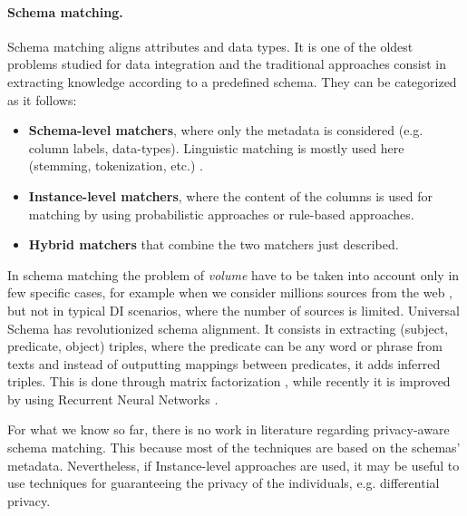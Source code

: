 \documentclass[12pt]{article}
\begin{document}
\paragraph{Schema matching.}
Schema matching aligns attributes and data types. It is one of the oldest problems studied for data integration and the 
traditional approaches consist in extracting knowledge according to a predefined schema. They can be categorized as it follows:
\begin{itemize}
   \item \textbf{Schema-level matchers}, where only the metadata is considered (e.g. column labels, data-types). Linguistic matching is mostly used here (stemming, tokenization, etc.) \cite*{Bernstein2011}.
   \item \textbf{Instance-level matchers}, where the content of the columns is used for matching by using probabilistic approaches \cite*{Szymczak2016, Dasu2002} or rule-based approaches.
   \item \textbf{Hybrid matchers} that combine the two matchers just described.
\end{itemize}

In schema matching the problem of \textit{volume} have to be taken into account only in few specific cases, for example when we consider millions sources from the web \cite*{Pimplikar2012}, but not in typical DI scenarios, 
where the number of sources is limited.
Universal Schema \cite*{Riedel2013} has revolutionized schema alignment. It consists in extracting (subject, predicate, object) triples, where the predicate can be any word or phrase from texts and instead of outputting 
mappings between predicates, it adds inferred triples. This is done through matrix factorization \cite*{Riedel2013}, while recently it is improved by using 
Recurrent Neural Networks \cite*{Das2016,Nee2015}.

For what we know so far, there is no work in literature regarding privacy-aware schema matching. This because most of the techniques are based on the schemas' metadata. 
Nevertheless, if Instance-level approaches are used, it may be useful to use techniques for guaranteeing the privacy of the individuals, e.g. differential privacy.

\end{document}
